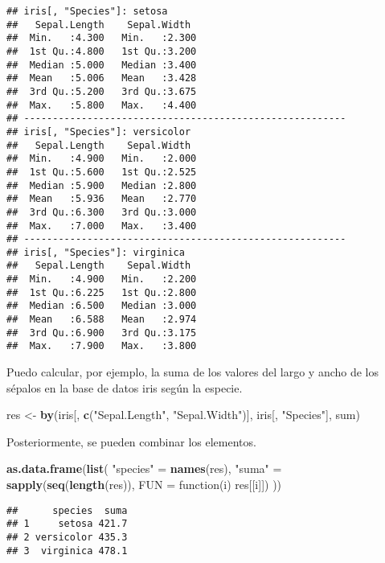 \documentclass[]{article}
\newenvironment{Shaded}{\begin{snugshade}}{\end{snugshade}}
\newcommand{\KeywordTok}[1]{\textcolor[rgb]{0.13,0.29,0.53}{\textbf{{#1}}}}
\newcommand{\DataTypeTok}[1]{\textcolor[rgb]{0.13,0.29,0.53}{{#1}}}
\newcommand{\StringTok}[1]{\textcolor[rgb]{0.31,0.60,0.02}{{#1}}}
\newcommand{\NormalTok}[1]{{#1}}
\begin{document}
\begin{verbatim}
## iris[, "Species"]: setosa
##   Sepal.Length    Sepal.Width   
##  Min.   :4.300   Min.   :2.300  
##  1st Qu.:4.800   1st Qu.:3.200  
##  Median :5.000   Median :3.400  
##  Mean   :5.006   Mean   :3.428  
##  3rd Qu.:5.200   3rd Qu.:3.675  
##  Max.   :5.800   Max.   :4.400  
## -------------------------------------------------------- 
## iris[, "Species"]: versicolor
##   Sepal.Length    Sepal.Width   
##  Min.   :4.900   Min.   :2.000  
##  1st Qu.:5.600   1st Qu.:2.525  
##  Median :5.900   Median :2.800  
##  Mean   :5.936   Mean   :2.770  
##  3rd Qu.:6.300   3rd Qu.:3.000  
##  Max.   :7.000   Max.   :3.400  
## -------------------------------------------------------- 
## iris[, "Species"]: virginica
##   Sepal.Length    Sepal.Width   
##  Min.   :4.900   Min.   :2.200  
##  1st Qu.:6.225   1st Qu.:2.800  
##  Median :6.500   Median :3.000  
##  Mean   :6.588   Mean   :2.974  
##  3rd Qu.:6.900   3rd Qu.:3.175  
##  Max.   :7.900   Max.   :3.800
\end{verbatim}

Puedo calcular, por ejemplo, la suma de los valores del largo y ancho de
los sépalos en la base de datos iris según la especie.

\begin{Shaded}
\begin{Highlighting}[]
\NormalTok{res <-}\StringTok{ }\KeywordTok{by}\NormalTok{(iris[, }\KeywordTok{c}\NormalTok{(}\StringTok{"Sepal.Length"}\NormalTok{, }\StringTok{"Sepal.Width"}\NormalTok{)], iris[, }\StringTok{"Species"}\NormalTok{], sum)}
\end{Highlighting}
\end{Shaded}

Posteriormente, se pueden combinar los elementos.

\begin{Shaded}
\begin{Highlighting}[]
\KeywordTok{as.data.frame}\NormalTok{(}\KeywordTok{list}\NormalTok{(}
  \StringTok{"species"} \NormalTok{=}\StringTok{ }\KeywordTok{names}\NormalTok{(res), }
  \StringTok{"suma"} \NormalTok{=}\StringTok{ }\KeywordTok{sapply}\NormalTok{(}\KeywordTok{seq}\NormalTok{(}\KeywordTok{length}\NormalTok{(res)), }\DataTypeTok{FUN =} \NormalTok{function(i) res[[i]])}
  \NormalTok{))}
\end{Highlighting}
\end{Shaded}

\begin{verbatim}
##      species  suma
## 1     setosa 421.7
## 2 versicolor 435.3
## 3  virginica 478.1
\end{verbatim}
\end{document}
